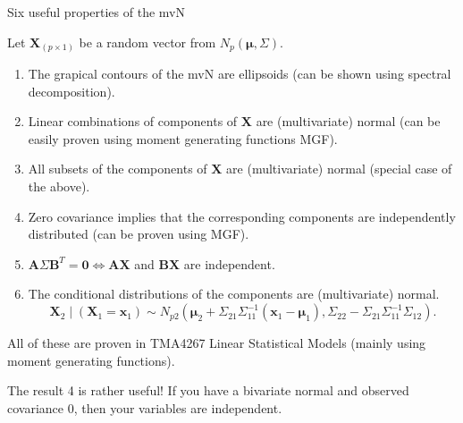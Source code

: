 \documentclass[ignorenonframetext,]{beamer}
\providecommand{\tightlist}{%
  \setlength{\itemsep}{0pt}\setlength{\parskip}{0pt}}
\begin{document}
\begin{frame}

\begin{block}{Six useful properties of the mvN}

Let \(\mathbf{X}_{(p\times 1)}\) be a random vector from
\(N_p(\mathbf{\mu},\Sigma)\).

\begin{enumerate}
\def\labelenumi{\arabic{enumi}.}
\tightlist
\item
  The grapical contours of the mvN are ellipsoids (can be shown using
  spectral decomposition).
\item
  Linear combinations of components of \(\mathbf{X}\) are (multivariate)
  normal (can be easily proven using moment generating functions MGF).
\item
  All subsets of the components of \(\mathbf{X}\) are (multivariate)
  normal (special case of the above).
\item
  Zero covariance implies that the corresponding components are
  independently distributed (can be proven using MGF).
\item
  \(\mathbf{A}\Sigma\mathbf{B}^T=\mathbf{0} \Leftrightarrow \mathbf{A}\mathbf{X}\)
  and \(\mathbf{B}\mathbf{X}\) are independent.
\item
  The conditional distributions of the components are (multivariate)
  normal.
  \[\mathbf{X}_2 \mid (\mathbf{X}_1=\mathbf{x}_1) \sim N_{p2}(\mathbf{\mu}_2+               \Sigma_{21}\Sigma_{11}^{-1} (\mathbf{x}_1-\mathbf{\mu}_1),\Sigma_{22}-\Sigma_{21}\Sigma_{11}^{-1}\Sigma_{12}).\]
\end{enumerate}

\end{block}

\end{frame}

\begin{frame}

All of these are proven in TMA4267 Linear Statistical Models (mainly
using moment generating functions).

The result 4 is rather useful! If you have a bivariate normal and
observed covariance 0, then your variables are independent.

\end{frame}
\end{document}
